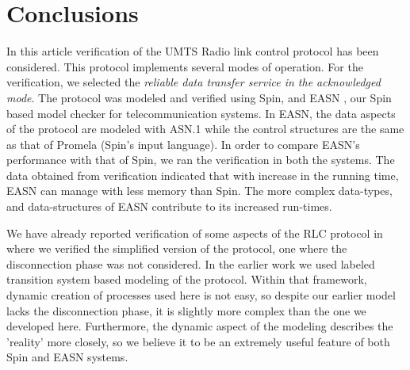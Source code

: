 \documentclass{entcs} \usepackage{entcsmacro}
\begin{document}
\section{Conclusions}

In this article verification of the UMTS Radio link control protocol
\cite{3g-RLC} has been considered. This protocol implements several modes of
operation. For the verification, we selected the {\em reliable data
transfer service in the acknowledged mode}. The protocol was modeled
and verified using Spin, and EASN \cite{easnspin}, our Spin
\cite{Spin} based model checker for telecommunication systems. In
EASN, the data aspects of the protocol are modeled with ASN.1
\cite{asn1} while the control structures are the same as that of
Promela (Spin's input language). In order to compare EASN's
performance with that of Spin, we ran the verification in both the
systems. The data obtained from verification indicated that with
increase in the running time, EASN can manage with less memory than
Spin. The more complex data-types, and data-structures of EASN
contribute to its increased run-times.

We have already reported verification of some aspects of the RLC
protocol in \cite{DSVV2000} where we verified the simplified version
of the protocol, one where the disconnection phase was not
considered. In the earlier work we used labeled transition system
based modeling of the protocol. Within that framework, dynamic
creation of processes used here is not easy, so despite our earlier
model lacks the disconnection phase, it is slightly more complex than
the one we developed here. Furthermore, the dynamic aspect of the
modeling describes the 'reality' more closely, so we believe it to be
an extremely useful feature of both Spin and EASN systems.



\end{document}
